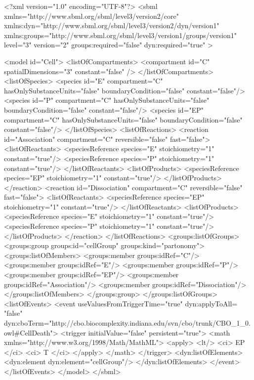 \begin{example}
<?xml version="1.0" encoding="UTF-8"?>
<sbml xmlns="http://www.sbml.org/sbml/level3/version2/core" 
      xmlns:dyn="http://www.sbml.org/sbml/level3/version2/dyn/version1" 
      xmlns:groups="http://www.sbml.org/sbml/level3/version1/groups/version1"
      level="3" version="2" groups:required="false" dyn:required="true" >

	<model id="Cell">
		<listOfCompartments>
			<compartment id="C" spatialDimensions="3" constant="false" />
		</listOfCompartments>
		<listOfSpecies>
			<species id="E" compartment="C" hasOnlySubstanceUnits="false" 
			         boundaryCondition="false" constant="false"/>
			<species id="P" compartment="C" hasOnlySubstanceUnits="false" 
			         boundaryCondition="false" constant="false"/>
			<species id="EP" compartment="C" hasOnlySubstanceUnits="false" 
			         boundaryCondition="false" constant="false"/>
		</listOfSpecies>
		<listOfReactions>
			<reaction id="Association" compartment="C" reversible="false" fast="false">
				<listOfReactants>
					<speciesReference species="E" stoichiometry="1" constant="true"/>
					<speciesReference species="P" stoichiometry="1" constant="true"/>
				</listOfReactants>
				<listOfProducts>
					<speciesReference species="EP" stoichiometry="1" constant="true"/>
				</listOfProducts>
			</reaction>
			<reaction id="Dissociation" compartment="C" reversible="false" fast="false">
				<listOfReactants>
					<speciesReference species="EP" stoichiometry="1" constant="true"/>
				</listOfReactants>
				<listOfProducts>
					<speciesReference species="E" stoichiometry="1" constant="true"/>
					<speciesReference species="P" stoichiometry="1" constant="true"/>
				</listOfProducts>
			</reaction>
		</listOfReactions>
		<groups:listOfGroups>
			<groups:group groups:id="cellGroup" groups:kind="partonomy">
				<groups:listOfMembers>
					<groups:member groups:idRef="C"/>
					<groups:member groups:idRef="E"/>
					<groups:member groups:idRef="P"/>
					<groups:member groups:idRef="EP"/>
					<groups:member groups:idRef="Association"/>
					<groups:member groups:idRef="Dissociation"/>
				</groups:listOfMembers>
			</groups:group>	
		</groups:listOfGroups>
		<listOfEvents>
			<event useValuesFromTriggerTime="true" dyn:applyToAll= "false" 
			dyn:cboTerm="http://cbo.biocomplexity.indiana.edu/svn/cbo/trunk/CBO_1_0.owl#CellDeath">
				<trigger initialValue="false" persistent="true">
					<math xmlns="http://www.w3.org/1998/Math/MathML">
						<apply> <lt/> <ci> EP </ci> <ci> T </ci> </apply>
					</math>
				</trigger>
				<dyn:listOfElements>
					<dyn:element dyn:element="cellGroup"/>
				</dyn:listOfElements>
			</event>
		</listOfEvents>
	</model>
</sbml>
\end{example}


